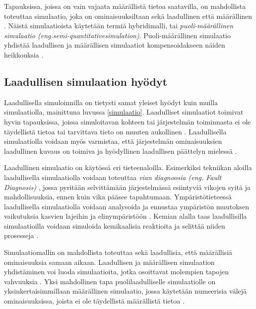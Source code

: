 \documentclass[utf8]{gradu3}
\begin{document}
Tapauksissa, joissa on vain vajaata määrällistä tietoa saatavilla,
on mahdollista toteuttaa simulaatio, 
joka on ominaisuuksiltaan sekä laadullinen että määrällinen 
\parencite{semiHybrid1997qualitative}. 
Näistä simulaatioista käytetään termiä hybridimalli, tai
\textit{ puoli-määrällinen simulaatio 
(eng.semi-quantitativesimulation)}. 
Puoli-määrällinen simulaatio yhdistää laadullisen ja määrällisen simulaatiot
kompensoidakseen näiden heikkouksia \parencite{semiHybrid1997qualitative}.

\subsection{Laadullisen simulaation hyödyt}
Laadullisella simuloinnilla on tietysti samat yleiset hyödyt 
kuin muilla simulaatiolla, mainittuna luvussa \ref{simulaatio}. 
Laadulliset simulaatiot toimivat hyvin tapauksissa, 
joissa simuloitavan kohteen tai järjestelmän toiminnasta 
ei ole täydellistä tietoa tai tarvittava tieto on 
muuten aukollinen \parencite{kuipers1986qualitative}. 
Laadullisella simulaatiolla voidaan myös varmistaa, että järjestelmän
ominaisuuksien laadullinen kuvaus on toimiva ja hyödyllinen 
laadullisen päättelyn mielessä \parencite{kuipers1986qualitative}.

Laadullinen simulaatio on käytössä eri tieteenaloilla.
Esimerkiksi tekniikan aloilla laadullisella simulaatiolla voidaan toteuttaa
\textit{vian diagnoosia (eng. Fault Diagnosis)} \parencite{QualitativeReasoning1997},
jossa pyritään selvittämään järjestelmässä esiintyviä vikojen syitä ja mahdollisuuksia, 
ennen kuin vika pääsee tapahtumaan.
Ympäristötieteessä laadullisella simulaatiolla voidaan analysoida ja ennustaa
ympäristön muutoksen vaikutuksia kasvien lajeihin ja elinympäristöön \parencite{qualiAnalysisEnviron2010}.
Kemian alalla taas laadullisilla simulaatioilla voidaan simuloida kemikaalisia 
reaktioita ja selittää niiden prosesseja \parencite{chemistryQualitativeSim2002}.

Simulaatiomallin on mahdollista toteuttaa sekä laadullisia, 
että määrällisiä ominaisuuksia samaan aikaan. 
Laadullisen ja määrällisen simulaation yhdistäminen voi luoda simulaatioita, 
jotka osoittavat molempien tapojen vahvuuksia 
\parencite{semiHybrid1997qualitative}. 
Yksi mahdollinen tapa puolilaadulliselle simulaatiolle on yksinkertaisimmillaan
määrällinen simulaatio, jossa käytetään numeerisia välejä ominaisuuksissa, 
joista ei ole täydellistä määrällistä tietoa \parencite{semiHybrid1997qualitative}.
\end{document}
